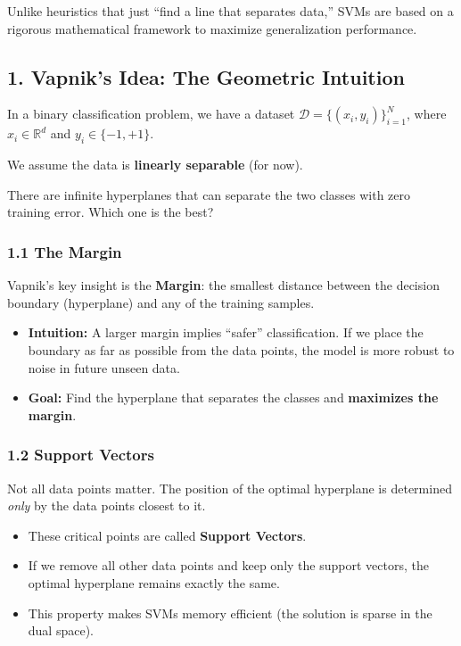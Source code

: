 \documentclass[
  italian,
  11pt,
]{article}
\begin{document}
Unlike heuristics that just ``find a line that separates data,'' SVMs
are based on a rigorous mathematical framework to maximize
generalization performance.

\subsection{1. Vapnik's Idea: The Geometric
Intuition}\label{vapniks-idea-the-geometric-intuition}

In a binary classification problem, we have a dataset
\(\mathcal{D} = \{(x_i, y_i)\}_{i=1}^N\), where \(x_i \in \mathbb{R}^d\)
and \(y_i \in \{-1, +1\}\).

We assume the data is \textbf{linearly separable} (for now).

There are infinite hyperplanes that can separate the two classes with
zero training error. Which one is the best?

\subsubsection{1.1 The Margin}\label{the-margin}

Vapnik's key insight is the \textbf{Margin}: the smallest distance
between the decision boundary (hyperplane) and any of the training
samples.

\begin{itemize}
\item
  \textbf{Intuition:} A larger margin implies ``safer'' classification.
  If we place the boundary as far as possible from the data points, the
  model is more robust to noise in future unseen data.
\item
  \textbf{Goal:} Find the hyperplane that separates the classes and
  \textbf{maximizes the margin}.
\end{itemize}

\subsubsection{1.2 Support Vectors}\label{support-vectors}

Not all data points matter. The position of the optimal hyperplane is
determined \emph{only} by the data points closest to it.

\begin{itemize}
\item
  These critical points are called \textbf{Support Vectors}.
\item
  If we remove all other data points and keep only the support vectors,
  the optimal hyperplane remains exactly the same.
\item
  This property makes SVMs memory efficient (the solution is sparse in
  the dual space).
\end{itemize}
\end{document}
